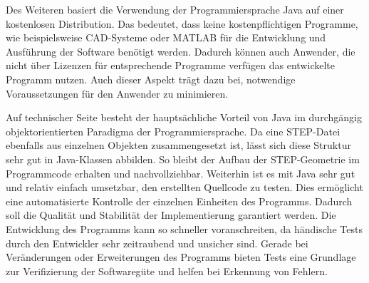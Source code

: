 Des Weiteren basiert die Verwendung der Programmiersprache Java auf einer kostenlosen Distribution. Das bedeutet, dass keine kostenpflichtigen Programme, wie beispielsweise CAD-Systeme oder MATLAB für die Entwicklung und Ausführung der Software benötigt werden. Dadurch können auch Anwender, die nicht über Lizenzen für entsprechende Programme verfügen das entwickelte Programm nutzen. Auch dieser Aspekt trägt dazu bei, notwendige Voraussetzungen für den Anwender zu minimieren.

Auf technischer Seite besteht der hauptsächliche Vorteil von Java im durchgängig objektorientierten Paradigma der Programmiersprache. Da eine STEP-Datei ebenfalls aus einzelnen Objekten zusammengesetzt ist, lässt sich diese Struktur sehr gut in Java-Klassen abbilden. So bleibt der Aufbau der STEP-Geometrie im Programmcode erhalten und nachvollziehbar. 
Weiterhin ist es mit Java sehr gut und relativ einfach umsetzbar, den erstellten Quellcode zu testen. Dies ermöglicht eine automatisierte Kontrolle der einzelnen Einheiten des Programms. Dadurch soll die Qualität und Stabilität der Implementierung garantiert werden. Die Entwicklung des Programms kann so schneller voranschreiten, da händische Tests durch den Entwickler sehr zeitraubend und unsicher sind. Gerade bei Veränderungen oder Erweiterungen des Programms bieten Tests eine Grundlage zur Verifizierung der Softwaregüte und helfen bei Erkennung von Fehlern.     




       
 